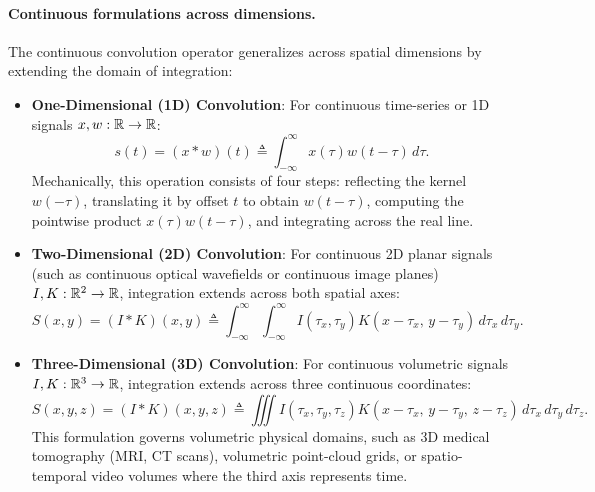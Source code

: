 \paragraph{Continuous formulations across dimensions.}
The continuous convolution operator generalizes across spatial dimensions by extending the domain of integration:
\begin{itemize}[leftmargin=*]
  \item \textbf{One-Dimensional (1D) Convolution}: For continuous time-series or 1D signals $x, w: \mathbb{R} \to \mathbb{R}$:
    \begin{equation}
    s(t) = (x * w)(t) \triangleq \int_{-\infty}^{\infty} x(\tau) w(t - \tau) \, d\tau.
    \label{eq:continuous_1d_convolution}
    \end{equation}
    Mechanically, this operation consists of four steps: reflecting the kernel $w(-\tau)$, translating it by offset $t$ to obtain $w(t - \tau)$, computing the pointwise product $x(\tau) w(t - \tau)$, and integrating across the real line.
  \item \textbf{Two-Dimensional (2D) Convolution}: For continuous 2D planar signals (such as continuous optical wavefields or continuous image planes) $I, K: \mathbb{R}^2 \to \mathbb{R}$, integration extends across both spatial axes:
    \begin{equation}
    S(x, y) = (I * K)(x, y) \triangleq \int_{-\infty}^{\infty} \int_{-\infty}^{\infty} I(\tau_x, \tau_y) K(x - \tau_x, \, y - \tau_y) \, d\tau_x \, d\tau_y.
    \label{eq:continuous_2d_convolution}
    \end{equation}
  \item \textbf{Three-Dimensional (3D) Convolution}: For continuous volumetric signals $I, K: \mathbb{R}^3 \to \mathbb{R}$, integration extends across three continuous coordinates:
    \begin{equation}
    S(x, y, z) = (I * K)(x, y, z) \triangleq \iiint I(\tau_x, \tau_y, \tau_z) K(x - \tau_x, \, y - \tau_y, \, z - \tau_z) \, d\tau_x \, d\tau_y \, d\tau_z.
    \label{eq:continuous_3d_convolution}
    \end{equation}
    This formulation governs volumetric physical domains, such as 3D medical tomography (MRI, CT scans), volumetric point-cloud grids, or spatio-temporal video volumes where the third axis represents time.
\end{itemize}

